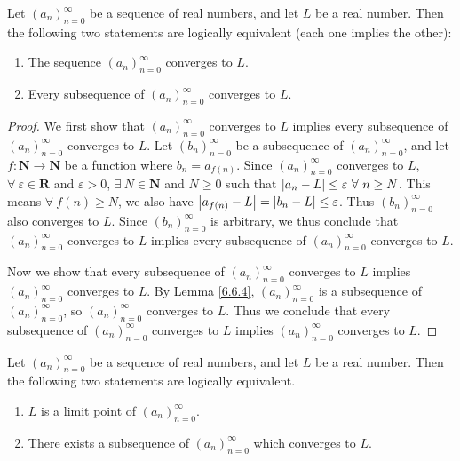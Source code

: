 \begin{proposition}\label{6.6.5}
    Let \((a_n)_{n = 0}^\infty\) be a sequence of real numbers, and let \(L\) be a real number.
    Then the following two statements are logically equivalent (each one implies the other):
    \begin{enumerate}
        \item The sequence \((a_n)_{n = 0}^\infty\) converges to \(L\).
        \item Every subsequence of \((a_n)_{n = 0}^\infty\) converges to \(L\).
    \end{enumerate}
\end{proposition}

\begin{proof}
    We first show that \((a_n)_{n = 0}^\infty\) converges to \(L\) implies every subsequence of \((a_n)_{n = 0}^\infty\) converges to \(L\).
    Let \((b_n)_{n = 0}^\infty\) be a subsequence of \((a_n)_{n = 0}^\infty\), and let \(f : \mathbf{N} \to \mathbf{N}\) be a function where \(b_n = a_{f(n)}\).
    Since \((a_n)_{n = 0}^\infty\) converges to \(L\), \(\forall\ \varepsilon \in \mathbf{R}\) and \(\varepsilon > 0\), \(\exists\ N \in \mathbf{N}\) and \(N \geq 0\) such that \(\abs*{a_n - L} \leq \varepsilon \ \forall\ n \geq N\).
    This means \(\forall\ f(n) \geq N\), we also have \(\abs*{a_{f(n)} - L} = \abs*{b_n - L} \leq \varepsilon\).
    Thus \((b_n)_{n = 0}^\infty\) also converges to \(L\).
    Since \((b_n)_{n = 0}^\infty\) is arbitrary, we thus conclude that \((a_n)_{n = 0}^\infty\) converges to \(L\) implies every subsequence of \((a_n)_{n = 0}^\infty\) converges to \(L\).

    Now we show that every subsequence of \((a_n)_{n = 0}^\infty\) converges to \(L\) implies \((a_n)_{n = 0}^\infty\) converges to \(L\).
    By Lemma \ref{6.6.4}, \((a_n)_{n = 0}^\infty\) is a subsequence of \((a_n)_{n = 0}^\infty\), so \((a_n)_{n = 0}^\infty\) converges to \(L\).
    Thus we conclude that every subsequence of \((a_n)_{n = 0}^\infty\) converges to \(L\) implies \((a_n)_{n = 0}^\infty\) converges to \(L\).
\end{proof}

\begin{proposition}\label{6.6.6}
    Let \((a_n)_{n = 0}^\infty\) be a sequence of real numbers, and let \(L\) be a real number.
    Then the following two statements are logically equivalent.
    \begin{enumerate}
        \item \(L\) is a limit point of \((a_n)_{n = 0}^\infty\).
        \item There exists a subsequence of \((a_n)_{n = 0}^\infty\) which converges to \(L\).
    \end{enumerate}
\end{proposition}

